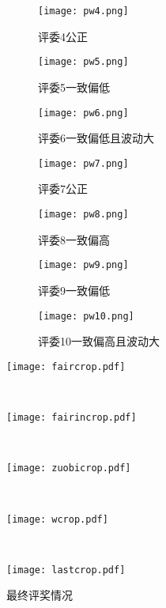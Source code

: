 \documentclass{my_paper}
\begin{document}
	\begin{figure}[htbp]
		\centering
		\texttt{[image: pw4.png]}
		\caption{评委4公正}
	\end{figure}
	
	\begin{figure}[htbp]
		\centering
		\texttt{[image: pw5.png]}
		\caption{评委5一致偏低}
	\end{figure}
	\begin{figure}[htbp]
		\centering
		\texttt{[image: pw6.png]}
		\caption{评委6一致偏低且波动大}
	\end{figure}
	\begin{figure}[htbp]
		\centering
		\texttt{[image: pw7.png]}
		\caption{评委7公正}
	\end{figure}
	\begin{figure}[htbp]
		\centering
		\texttt{[image: pw8.png]}
		\caption{评委8一致偏高}
	\end{figure}
	\begin{figure}[htbp]
		\centering
		\texttt{[image: pw9.png]}
		\caption{评委9一致偏低}
	\end{figure}
	\begin{figure}[htbp]
		\centering
		\texttt{[image: pw10.png]}
		\caption{评委10一致偏高且波动大}
	\end{figure}	
	\newpage
	\begin{table}[htbp]
		\centering
		\texttt{[image: faircrop.pdf]}
	\end{table}\\
	\begin{table}[htbp]
		\centering
		\texttt{[image: fairincrop.pdf]}
	\end{table}\\
	\begin{table}[htbp]
		\centering
		\texttt{[image: zuobicrop.pdf]}
	\end{table}\\
	\newpage
	\begin{table}[htbp]
		\centering
		\texttt{[image: wcrop.pdf]}
	\end{table}\\
	\begin{table}[htbp]
		\centering
		\texttt{[image: lastcrop.pdf]}
		\caption{最终评奖情况}
	\end{table}\\
 	\newpage
	
\end{document}
